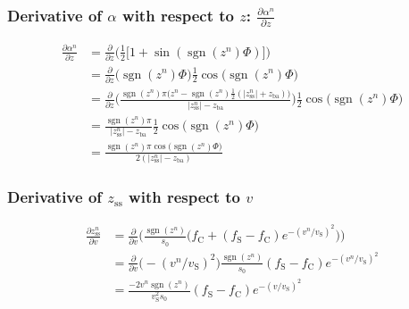 \documentclass{article}
\DeclareMathOperator{\sgn}{sgn}
\begin{document}
\subsubsection*{Derivative of $\alpha$ with respect to $z$: $\frac{\partial \alpha^n}{\partial z}$}
\begin{equation}
    \begin{aligned}
    \frac{\partial \alpha^n}{\partial z} &= \frac{\partial}{\partial z} \Bigg(\frac{1}{2}\big[1+\sin(\sgn(z^n)\Phi)\big]\Bigg)\\
    &= \frac{\partial}{\partial z}\Big(\sgn(z^n)\Phi\Big)\frac{1}{2}\cos\big(\sgn(z^n)\Phi\big)\\
    &= \frac{\partial}{\partial z}\Bigg(\frac{\sgn(z^n)\pi\big(z^n-\sgn(z^n)\frac{1}{2}(|z_\text{ss}^n|+z_\text{ba})\big)}{|z_\text{ss}^n|-z_\text{ba}}\Bigg)\frac{1}{2}\cos\big(\sgn(z^n)\Phi\big)\\
    &= \frac{\sgn(z^n)\pi}{|z_\text{ss}^n|-z_\text{ba}}\frac{1}{2}\cos\big(\sgn(z^n)\Phi\big)\\
    &= \frac{\sgn(z^n)\pi\cos\big(\sgn(z^n)\Phi\big)}{2(|z_\text{ss}^n|-z_\text{ba})}
    \end{aligned}
\end{equation}
\subsubsection*{Derivative of $z_\text{ss}$ with respect to $v$}
\begin{equation}
\begin{aligned}
    \frac{\partial z_\text{ss}^n}{\partial v} &= \frac{\partial}{\partial v} \Bigg(\frac{\sgn(z^n)}{s_0}\Big(f_\text{C}+(f_\text{S}-f_\text{C})e^{-(v^n/v_\text{S})^2}\Big)\Bigg)\\
    &= \frac{\partial}{\partial v}\big(-(v^n/v_\text{S})^2\big)\frac{\sgn(z^n)}{s_0}(f_\text{S}-f_\text{C})e^{-(v^n/v_\text{S})^2}\\
    &= \frac{-2v^n\sgn(z^n)}{v_\text{S}^2s_0}(f_\text{S}-f_\text{C})e^{-(v/v_\text{S})^2}
    \end{aligned}
\end{equation}
\end{document}

